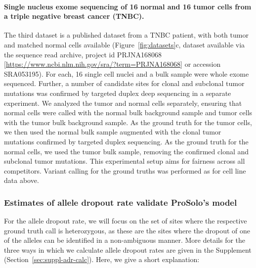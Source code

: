 \documentclass[12pt,inline]{wlscirep}
\begin{document}
\paragraph{Single nucleus exome sequencing of 16 normal and 16 tumor cells from a triple negative breast cancer (TNBC)\cite{wang_clonal_2014}.}
The third dataset is a published dataset from a TNBC patient, with both tumor and matched normal cells available (Figure~\ref{fig:datasets}c, dataset available via the sequence read archive, project id \mbox{PRJNA168068} [\url{https://www.ncbi.nlm.nih.gov/sra/?term=PRJNA168068}] or accession \mbox{SRA053195}).
For each, 16 single cell nuclei and a bulk sample were whole exome sequenced.
Further, a number of candidate sites for clonal and subclonal tumor mutations was confirmed by targeted duplex deep sequencing in a separate experiment\cite{wang_clonal_2014}.
We analyzed the tumor and normal cells separately, ensuring that normal cells were called with the normal bulk background sample and tumor cells with the tumor bulk background sample.
As the ground truth for the tumor cells, we then used the normal bulk sample augmented with the clonal tumor mutations confirmed by targeted duplex sequencing.
As the ground truth for the normal cells, we used the tumor bulk sample, removing the confirmed clonal and subclonal tumor mutations.
This experimental setup aims for fairness across all competitors. 
Variant calling for the ground truths was performed as for cell line data above.

\subsubsection*{Estimates of allele dropout rate validate ProSolo's model}

For the allele dropout rate, we will focus on the set of sites where the respective ground truth call is heterozygous, as these are the sites where the dropout of one of the alleles can be identified in a non-ambiguous manner.
More details for the three ways in which we calculate allele dropout rates are given in the Supplement (Section~\ref{sec:suppl-adr-calc}).
Here, we give a short explanation:
\end{document}
